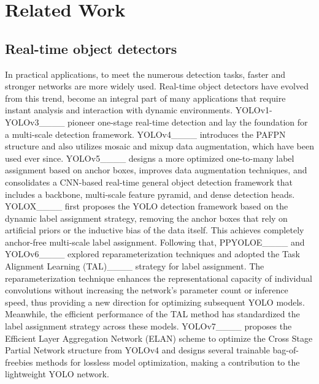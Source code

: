 \section{Related Work}
\subsection{Real-time object detectors}
In practical applications, to meet the numerous detection tasks, faster and stronger networks are more widely used. Real-time object detectors have evolved from this trend, become an integral part of many applications that require instant analysis and interaction with dynamic environments. YOLOv1-YOLOv3____ pioneer one-stage real-time detection and lay the foundation for a multi-scale detection framework. YOLOv4____ introduces the PAFPN structure and also utilizes mosaic and mixup data augmentation, which have been used ever since. YOLOv5____ designs a more optimized one-to-many label assignment based on anchor boxes, improves data augmentation techniques, and consolidates a CNN-based real-time general object detection framework that includes a backbone, multi-scale feature pyramid, and dense detection heads. YOLOX____ first proposes the YOLO detection framework based on the dynamic label assignment strategy, removing the anchor boxes that rely on artificial priors or the inductive bias of the data itself. This achieves completely anchor-free multi-scale label assignment. 
Following that, PPYOLOE____ and YOLOv6____ explored reparameterization techniques and adopted the Task Alignment Learning (TAL)____ strategy for label assignment. The reparameterization technique enhances the representational capacity of individual convolutions without increasing the network’s parameter count or inference speed, thus providing a new direction for optimizing subsequent YOLO models. Meanwhile, the efficient performance of the TAL method has standardized the label assignment strategy across these models.
YOLOv7____ proposes the Efficient Layer Aggregation Network (ELAN) scheme to optimize the Cross Stage Partial Network structure from YOLOv4 and designs several trainable bag-of-freebies methods for lossless model optimization, making a contribution to the lightweight YOLO network. 

